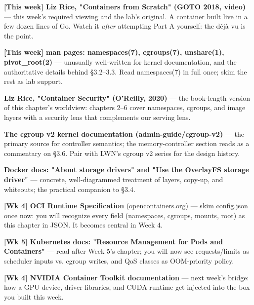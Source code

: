 \begin{tbbitemize}
  \item \textbf{[This week] Liz Rice, "Containers from Scratch" (GOTO 2018, video)} — this week's required viewing and the lab's original. A container built live in a few dozen lines of Go. Watch it \textit{after} attempting Part A yourself: the déjà vu is the point.
  \item \textbf{[This week] man pages: namespaces(7), cgroups(7), unshare(1), pivot\_root(2)} — unusually well-written for kernel documentation, and the authoritative details behind §3.2–3.3. Read namespaces(7) in full once; skim the rest as lab support.
  \item \textbf{Liz Rice, "Container Security" (O'Reilly, 2020)} — the book-length version of this chapter's worldview: chapters 2–6 cover namespaces, cgroups, and image layers with a security lens that complements our serving lens.
  \item \textbf{The cgroup v2 kernel documentation (admin-guide/cgroup-v2)} — the primary source for controller semantics; the memory-controller section reads as a commentary on §3.6. Pair with LWN's cgroup v2 series for the design history.
  \item \textbf{Docker docs: "About storage drivers" and "Use the OverlayFS storage driver"} — concrete, well-diagrammed treatment of layers, copy-up, and whiteouts; the practical companion to §3.4.
  \item \textbf{[Wk 4] OCI Runtime Specification} (opencontainers.org) — skim config.json once now: you will recognize every field (namespaces, cgroups, mounts, root) as this chapter in JSON. It becomes central in Week 4.
  \item \textbf{[Wk 5] Kubernetes docs: "Resource Management for Pods and Containers"} — read after Week 5's chapter; you will now see requests/limits as scheduler inputs vs. cgroup writes, and QoS classes as OOM-priority policy.
  \item \textbf{[Wk 4] NVIDIA Container Toolkit documentation} — next week's bridge: how a GPU device, driver libraries, and CUDA runtime get injected into the box you built this week.
\end{tbbitemize}

\vspace{5.0pt}

